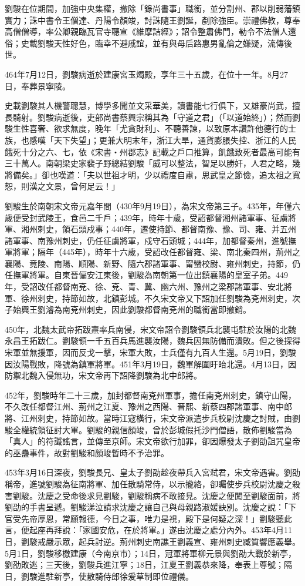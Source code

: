 劉駿在位期間，加強中央集權，撤除「錄尚書事」職銜，並分割州、郡以削弱藩鎮實力；誅中書令王僧達、丹陽令顏竣，討誅隨王劉誕，剷除強臣。崇禮佛教，尊奉高僧僧導，率公卿親臨瓦官寺聽宣《維摩詰經》；詔令整肅佛門，勒令不法僧人還俗；史載劉駿天性好色，臨幸不避戚誼，並有與母后路惠男亂倫之嫌疑，流傳後世。

464年7月12日，劉駿病逝於建康宮玉燭殿，享年三十五歲，在位十一年。8月27日，奉葬景寧陵。

史載劉駿其人機警聰慧，博學多聞並文采華美，讀書能七行俱下，又雄豪尚武，擅長騎射。劉駿病逝後，吏部尚書蔡興宗稱其為「守道之君」（「以道始終」）；然而劉駿生性喜奢、欲求無度，晚年「尤貪財利」、不聽善諫，以致原本讚許他德行的士族，也感嘆「天下失望」；更兼大明末年，浙江大旱，通貨膨脹失控、浙江的人民餓死十分之六、七，依《宋書‧州郡志》記載之戶口推算，飢餓致死者最高可能有三十萬人。南朝梁史家裴子野總結劉駿「威可以整法，智足以勝奸，人君之略，幾將備矣。」卻也嘆道：「夫以世祖才明，少以禮度自肅，思武皇之節儉，追太祖之寬恕，則漢之文景，曾何足云！」

劉駿生於南朝宋文帝元嘉年間（430年9月19日），為宋文帝第三子。435年，年僅六歲便受封武陵王，食邑二千戶；439年，時年十歲，受詔都督湘州諸軍事、征虜將軍、湘州刺史，領石頭戍事；440年，遷使持節、都督南豫、豫、司、雍、并五州諸軍事、南豫州刺史，仍任征虜將軍，戍守石頭城；444年，加都督秦州，進號撫軍將軍；隔年（445年），時年十六歲，受詔改任都督雍、梁、南北秦四州，荊州之襄陽、竟陵、南陽、順陽、新野、隨六郡諸軍事、甯蠻校尉、雍州刺史，持節，仍任撫軍將軍。自東晉偏安江東後，劉駿為南朝第一位出鎮襄陽的皇室子弟。449年，受詔改任都督南兗、徐、兗、青、冀、幽六州、豫州之梁郡諸軍事、安北將軍、徐州刺史，持節如故，北鎮彭城。不久宋文帝又下詔加任劉駿為兗州刺史，次子始興王劉濬為南兗州刺史，因此劉駿都督南兗州的職銜當即撤銷。

450年，北魏太武帝拓跋燾率兵南侵，宋文帝詔令劉駿領兵北襲屯駐於汝陽的北魏永昌王拓跋仁。劉駿領一千五百兵馬進襲汝陽，魏兵因無防備而潰敗。但之後探得宋軍並無援軍，因而反戈一擊，宋軍大敗，士兵僅有九百人生還。5月19日，劉駿因汝陽戰敗，降號為鎮軍將軍。451年3月19日，魏軍解圍盱眙北還。4月13日，因防禦北魏入侵無功，宋文帝再下詔降劉駿為北中郎將。

452年，劉駿時年二十三歲，加封都督南兗州軍事，擔任南兗州刺史，鎮守山陽，不久改任都督江州、荊州之江夏、豫州之西陽、晉熙、新蔡四郡諸軍事、南中郎將、江州刺史，持節如故。當時江寇橫行，宋文帝派遣步兵校尉沈慶之討賊，由劉駿全權統領征討大軍。劉駿的親信顏竣，曾於彭城假托沙門僧語，散佈劉駿當為「真人」的符讖謠言，並傳至京師。宋文帝欲行加罪，卻因爆發太子劉劭詛咒皇帝的巫蠱事件，故對劉駿和顏竣暫時不予治罪。

453年3月16日深夜，劉駿長兄、皇太子劉劭趁夜帶兵入宮弒君，宋文帝遇害。劉劭稱帝，進號劉駿為征南將軍、加任散騎常侍，以示攏絡，卻矚使步兵校尉沈慶之殺害劉駿。沈慶之受命後求見劉駿，劉駿稱病不敢接見。沈慶之便闖至劉駿面前，將劉劭的手書呈遞。劉駿涕泣請求沈慶之讓自己與母親路淑媛訣別。沈慶之說：「下官受先帝厚恩，常願報德，今日之事，唯力是視，殿下是何疑之深！」劉駿聽此言，便起座再拜說：「家國安危，在於將軍。」遂由沈慶之處分內外。453年4月11日，劉駿戒嚴示眾，起兵討逆。荊州刺史南譙王劉義宣、雍州刺史臧質響應義舉。5月1日，劉駿移檄建康（今南京市）；14日，冠軍將軍柳元景與劉劭大戰於新亭，劉劭敗逃；三天後，劉駿兵進江寧；18日，江夏王劉義恭來降，奉表上尊號；隔日，劉駿進駐新亭，使散騎侍郎徐爰草制即位禮儀。

